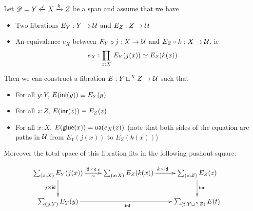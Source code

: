 \begin{lem}\label{lem:fibration-over-pushout}
  Let $\mathscr{D}=Y\xleftarrow{j}X\xrightarrow{k}Z$ be a span and assume
  that we have
  \begin{itemize}
  \item Two fibrations $E_Y:Y\to\mathcal{U}$ and $E_Z:Z\to\mathcal{U}$
  \item An equivalence $e_X$ between $E_Y\circ j:X\to\mathcal{U}$ and $E_Z\circ
    k:X\to\mathcal{U}$, ie
    \[e_X:\prd{x:X}\eqv{E_Y(j(x))}{E_Z(k(x))}\]
  \end{itemize}

  Then we can construct a fibration $E:Y\sqcup^XZ\to\mathcal{U}$ such that
  \begin{itemize}
  \item For all $y:Y$, $E({\mathsf{inl}}(y))\equiv E_Y(y)$
  \item For all $z:Z$, $E({\mathsf{inr}}(z))\equiv E_Z(z)$
  \item For all $x:X$, ${E}\mathopen{}\left({\mathsf{glue}(x)}\right)\mathclose{}=\mathsf{ua}(e_X(x))$ (note that both sides of
    the equation are paths in $\mathcal{U}$ from $E_Y(j(x))$ to $E_Z(k(x))$)
  \end{itemize}

  Moreover the total space of this fibration fits in the following pushout
  square:

  \[\xymatrix{ \sm{x:X}E_Y(j(x)) \ar[r]_\sim^{\idfunc\times e_X}
    \ar[d]_{j\times\idfunc} &
    \sm{x:X}E_Z(k(x)) \ar[r]^{k\times\idfunc}
    & \sm{z:Z}E_Z(z) \ar[d]^\inr \\
    \sm{y:Y}E_Y(y) \ar[rr]_\inl & & \sm{t:Y\sqcup^XZ}E(t) }\]
\end{lem}

